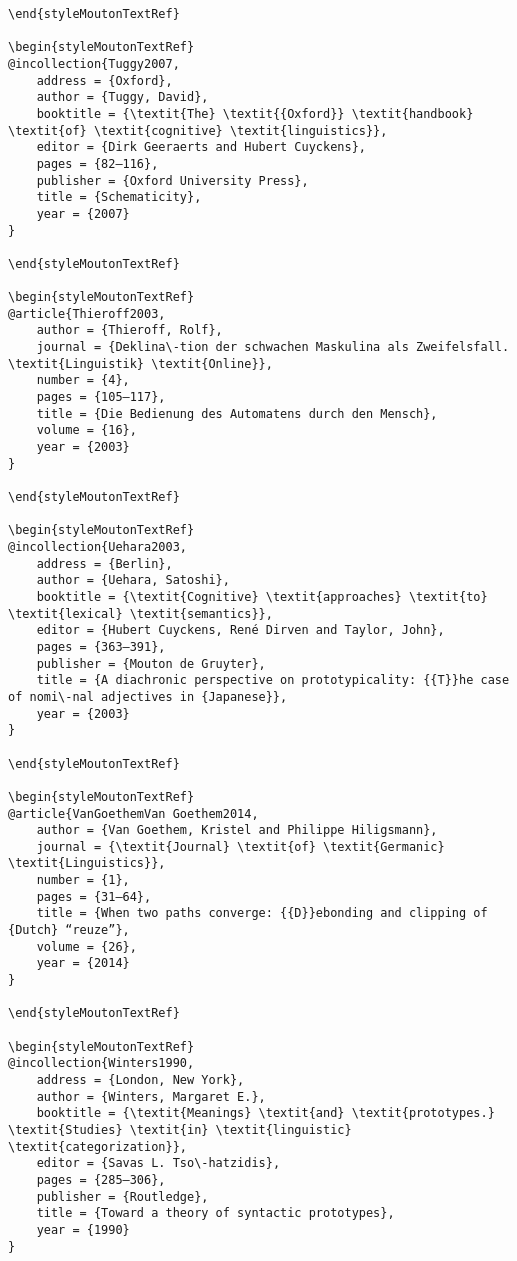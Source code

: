 \begin{styleMoutonHeadingi}
\begin{verbatim}
\end{styleMoutonTextRef}

\begin{styleMoutonTextRef}
@incollection{Tuggy2007,
	address = {Oxford},
	author = {Tuggy, David},
	booktitle = {\textit{The} \textit{{Oxford}} \textit{handbook} \textit{of} \textit{cognitive} \textit{linguistics}},
	editor = {Dirk Geeraerts and Hubert Cuyckens},
	pages = {82–116},
	publisher = {Oxford University Press},
	title = {Schematicity},
	year = {2007}
}

\end{styleMoutonTextRef}

\begin{styleMoutonTextRef}
@article{Thieroff2003,
	author = {Thieroff, Rolf},
	journal = {Deklina\-tion der schwachen Maskulina als Zweifelsfall. \textit{Linguistik} \textit{Online}},
	number = {4},
	pages = {105–117},
	title = {Die Bedienung des Automatens durch den Mensch},
	volume = {16},
	year = {2003}
}

\end{styleMoutonTextRef}

\begin{styleMoutonTextRef}
@incollection{Uehara2003,
	address = {Berlin},
	author = {Uehara, Satoshi},
	booktitle = {\textit{Cognitive} \textit{approaches} \textit{to} \textit{lexical} \textit{semantics}},
	editor = {Hubert Cuyckens, René Dirven and Taylor, John},
	pages = {363–391},
	publisher = {Mouton de Gruyter},
	title = {A diachronic perspective on prototypicality: {{T}}he case of nomi\-nal adjectives in {Japanese}},
	year = {2003}
}

\end{styleMoutonTextRef}

\begin{styleMoutonTextRef}
@article{VanGoethemVan Goethem2014,
	author = {Van Goethem, Kristel and Philippe Hiligsmann},
	journal = {\textit{Journal} \textit{of} \textit{Germanic} \textit{Linguistics}},
	number = {1},
	pages = {31–64},
	title = {When two paths converge: {{D}}ebonding and clipping of {Dutch} “reuze”},
	volume = {26},
	year = {2014}
}

\end{styleMoutonTextRef}

\begin{styleMoutonTextRef}
@incollection{Winters1990,
	address = {London, New York},
	author = {Winters, Margaret E.},
	booktitle = {\textit{Meanings} \textit{and} \textit{prototypes.} \textit{Studies} \textit{in} \textit{linguistic} \textit{categorization}},
	editor = {Savas L. Tso\-hatzidis},
	pages = {285–306},
	publisher = {Routledge},
	title = {Toward a theory of syntactic prototypes},
	year = {1990}
}


\end{verbatim}
\end{styleMoutonHeadingi}
